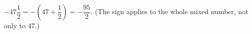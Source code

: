 $-47\dfrac12=-\left(47+\dfrac12\right)=\boxed{-\dfrac{95}2}$. (The sign applies to the whole mixed number, not only to $47$.)
